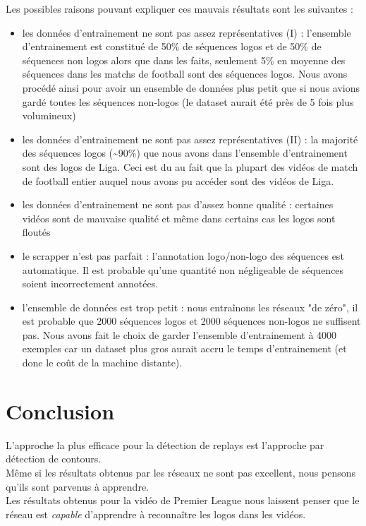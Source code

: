 \documentclass[11pt]{article}
\begin{document}
Les possibles raisons pouvant expliquer ces mauvais résultats sont les suivantes :\\
\begin{itemize}
\item les données d'entrainement ne sont pas assez représentatives (I) : l'ensemble d'entrainement est constitué de 50\% de séquences logos et de 50\% de séquences non logos alors que dans les faits, seulement 5\% en moyenne des séquences dans les matchs de football sont des séquences logos. Nous avons procédé ainsi pour avoir un ensemble de données plus petit que si nous avions gardé toutes les séquences non-logos (le dataset aurait été près de 5 fois plus volumineux)\\
\item les données d'entrainement ne sont pas assez représentatives (II) : la majorité des séquences logos (\textasciitilde{}90\%) que nous avons dans l'ensemble d'entrainement sont des logos de Liga. Ceci est du au fait que la plupart des vidéos de match de football entier auquel nous avons pu accéder sont des vidéos de Liga.\\
\item les données d'entrainement ne sont pas d'assez bonne qualité : certaines vidéos sont de mauvaise qualité et même dans certains cas les logos sont floutés\\
\item le scrapper n'est pas parfait : l'annotation logo/non-logo des séquences est automatique. Il est probable qu'une quantité non négligeable de séquences soient incorrectement annotées.\\
\item l'ensemble de données est trop petit : nous entraînons les réseaux "de zéro", il est probable que 2000 séquences logos et 2000 séquences non-logos ne suffisent pas. Nous avons fait le choix de garder l'ensemble d'entrainement à 4000 exemples car un dataset plus gros aurait accru le temps d'entrainement (et donc le coût de la machine distante).\\
\end{itemize}

\section{Conclusion}
\label{sec:org7438d9e}
L'approche la plus efficace pour la détection de replays est l'approche par détection de contours.\\
Même si les résultats obtenus par les réseaux ne sont pas excellent, nous pensons qu'ils sont parvenus à apprendre.\\
Les résultats obtenus pour la vidéo de Premier League nous laissent penser que le réseau est \emph{capable} d'apprendre à reconnaître les logos dans les vidéos.\\
\end{document}
